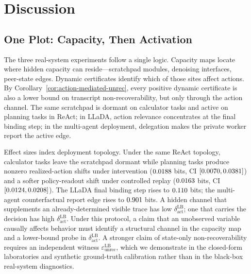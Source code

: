   \section{Discussion}
  \label{sec:discussion}

  \subsection{One Plot: Capacity, Then Activation}

  The three real-system experiments follow a single logic. Capacity maps locate
  where hidden capacity can reside---scratchpad modules, denoising interfaces,
  peer-state edges. Dynamic certificates identify which of those sites affect
  actions. By Corollary~\ref{cor:action-mediated-unrec}, every
  positive dynamic certificate is also a lower bound on transcript
  non-recoverability, but only through the action channel. The same scratchpad
  is dormant on calculator tasks and active on planning tasks in ReAct; in
  LLaDA, action relevance concentrates at the final binding step; in the
  multi-agent deployment, delegation makes the private worker report the active
  edge.

  Effect sizes index deployment topology. Under the same ReAct topology,
  calculator tasks leave the scratchpad dormant while planning tasks produce
  nonzero realized-action shifts under intervention
  ($0.0188$ bits, CI $[0.0070,0.0381]$) and a
  softer policy-readout shift under controlled replay ($0.0163$ bits,
  CI $[0.0124,0.0208]$). The LLaDA final binding step rises to
  $0.110$ bits; the multi-agent
  counterfactual report edge rises to $0.901$ bits. A
  hidden channel that supplements an already-determined visible trace has low
  $\delta_\text{act}^\text{LB}$; one that carries the decision has high
  $\delta_\text{act}^\text{LB}$. Under this protocol, a claim that an unobserved
  variable causally affects behavior must identify a structural channel in the
  capacity map and a lower-bound probe in
  $\delta_\text{act}^\text{LB}$. A stronger claim of state-only
  non-recoverability requires an independent witness
  $\varepsilon_\text{unrec}^\text{LB}$, which we demonstrate in the closed-form
  laboratories and synthetic ground-truth calibration rather than in the
  black-box real-system diagnostics.
